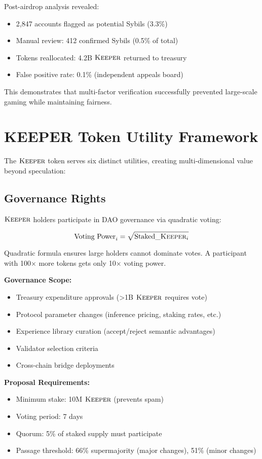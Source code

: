 \documentclass[11pt,letterpaper]{article}
\theoremstyle{definition}
\theoremstyle{remark}
\newcommand{\KEEPER}{\textsc{Keeper}}
\begin{document}
Post-airdrop analysis revealed:
\begin{itemize}
\item 2,847 accounts flagged as potential Sybils (3.3\%)
\item Manual review: 412 confirmed Sybils (0.5\% of total)
\item Tokens reallocated: 4.2B $\KEEPER$ returned to treasury
\item False positive rate: 0.1\% (independent appeals board)
\end{itemize}

This demonstrates that multi-factor verification successfully prevented large-scale gaming while maintaining fairness.

\section{KEEPER Token Utility Framework}

The $\KEEPER$ token serves six distinct utilities, creating multi-dimensional value beyond speculation:

\subsection{Governance Rights}

$\KEEPER$ holders participate in DAO governance via quadratic voting:

\begin{equation}
\text{Voting Power}_i = \sqrt{\text{Staked}\_\KEEPER_i}
\end{equation}

Quadratic formula ensures large holders cannot dominate votes. A participant with 100× more tokens gets only 10× voting power.

\textbf{Governance Scope:}
\begin{itemize}
\item Treasury expenditure approvals (>1B $\KEEPER$ requires vote)
\item Protocol parameter changes (inference pricing, staking rates, etc.)
\item Experience library curation (accept/reject semantic advantages)
\item Validator selection criteria
\item Cross-chain bridge deployments
\end{itemize}

\textbf{Proposal Requirements:}
\begin{itemize}
\item Minimum stake: 10M $\KEEPER$ (prevents spam)
\item Voting period: 7 days
\item Quorum: 5\% of staked supply must participate
\item Passage threshold: 66\% supermajority (major changes), 51\% (minor changes)
\end{itemize}
\end{document}
